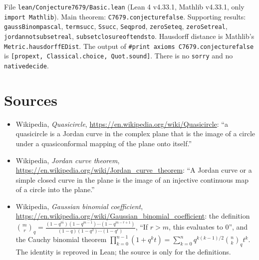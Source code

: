 \documentclass[11pt]{article}
\renewcommand{\_}{\oldus\allowbreak}
\theoremstyle{definition}
\theoremstyle{remark}
\begin{document}
File \texttt{lean/Conjecture7679/Basic.lean} (Lean 4 v4.33.1, Mathlib v4.33.1, only
\texttt{import Mathlib}). Main theorem: \texttt{C7679.conjecture\_7679\_false}. Supporting results:
\texttt{gaussBinom\_pascal}, \texttt{term\_succ}, \texttt{S\_succ}, \texttt{S\_eq\_prod},
\texttt{zeroSet\_eq}, \texttt{zeroSet\_real}, \texttt{jordan\_not\_subset\_real},
\texttt{subset\_closure\_of\_tendsto}. Hausdorff distance is Mathlib's
\texttt{Metric.hausdorffEDist}. The output of \texttt{\#print axioms C7679.conjecture\_7679\_false} is
\texttt{[propext, Classical.choice, Quot.sound]}. There is no \texttt{sorry} and no
\texttt{native\_decide}.

\section{Sources}\label{sec:sources}
\begin{itemize}
\item Wikipedia, \emph{Quasicircle}, \url{https://en.wikipedia.org/wiki/Quasicircle}: ``a quasicircle is
a Jordan curve in the complex plane that is the image of a circle under a quasiconformal mapping of
the plane onto itself.''
\item Wikipedia, \emph{Jordan curve theorem}, \url{https://en.wikipedia.org/wiki/Jordan_curve_theorem}:
``A Jordan curve or a simple closed curve in the plane is the image of an injective continuous map
of a circle into the plane.''
\item Wikipedia, \emph{Gaussian binomial coefficient},
\url{https://en.wikipedia.org/wiki/Gaussian_binomial_coefficient}: the definition
$\binom{m}{r}_q=\frac{(1-q^m)(1-q^{m-1})\cdots(1-q^{m-r+1})}{(1-q)(1-q^2)\cdots(1-q^r)}$, ``If $r > m$,
this evaluates to 0'', and the Cauchy binomial theorem
$\prod_{k=0}^{n-1}(1+q^kt)=\sum_{k=0}^{n}q^{k(k-1)/2}\binom{n}{k}_q t^k$. The identity is reproved in
Lean; the source is only for the definitions.
\end{itemize}
\end{document}
